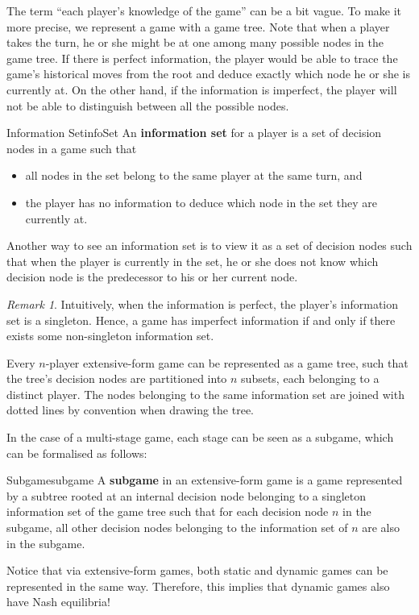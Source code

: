 \documentclass[math]{amznotes}
\theoremstyle{remark}
\newtheorem*{remark}{Remark}
\begin{document}
The term ``each player's knowledge of the game'' can be a bit vague. To make it more precise, we represent a game with a game tree. Note that when a player takes the turn, he or she might be at one among many possible nodes in the game tree. If there is perfect information, the player would be able to trace the game's historical moves from the root and deduce exactly which node he or she is currently at. On the other hand, if the information is imperfect, the player will not be able to distinguish between all the possible nodes.
\begin{dfnbox}{Information Set}{infoSet}
    An {\color{red} \textbf{information set}} for a player is a set of decision nodes in a game such that 
    \begin{itemize}
        \item all nodes in the set belong to the same player at the same turn, and
        \item the player has no information to deduce which node in the set they are currently at.
    \end{itemize}
\end{dfnbox}
Another way to see an information set is to view it as a set of decision nodes such that when the player is currently in the set, he or she does not know which decision node is the predecessor to his or her current node.
\begin{notebox}
    \begin{remark}
        Intuitively, when the information is perfect, the player's information set is a singleton. Hence, a game has imperfect information if and only if there exists some non-singleton information set.
    \end{remark}
\end{notebox}
Every $n$-player extensive-form game can be represented as a game tree, such that the tree's decision nodes are partitioned into $n$ subsets, each belonging to a distinct player. The nodes belonging to the same information set are joined with dotted lines by convention when drawing the tree.

In the case of a multi-stage game, each stage can be seen as a subgame, which can be formalised as follows:
\begin{dfnbox}{Subgame}{subgame}
    A {\color{red} \textbf{subgame}} in an extensive-form game is a game represented by a subtree rooted at an internal decision node belonging to a singleton information set of the game tree such that for each decision node $n$ in the subgame, all other decision nodes belonging to the information set of $n$ are also in the subgame.
\end{dfnbox}
Notice that via extensive-form games, both static and dynamic games can be represented in the same way. Therefore, this implies that dynamic games also have Nash equilibria! 
\end{document}
